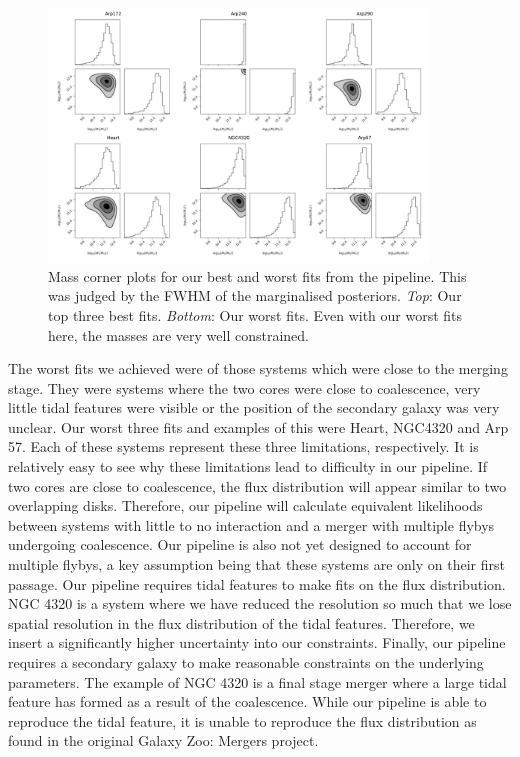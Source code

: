 \begin{figure}
    \centering
    \includegraphics[width=0.9\textwidth]{Chapter1/figures/masses-comb.pdf}
    \caption{Mass corner plots for our best and worst fits from the pipeline. This was judged by the FWHM of the marginalised posteriors. \textit{Top}: Our top three best fits. \textit{Bottom}: Our worst fits. Even with our worst fits here, the masses are very well constrained.}
    \label{fig:mass_constraint}
\end{figure}

The worst fits we achieved were of those systems which were close to the merging stage. They were systems where the two cores were close to coalescence, very little tidal features were visible or the position of the secondary galaxy was very unclear. Our worst three fits and examples of this were Heart, NGC4320 and Arp 57. Each of these systems represent these three limitations, respectively. It is relatively easy to see why these limitations lead to difficulty in our pipeline. If two cores are close to coalescence, the flux distribution will appear similar to two overlapping disks. Therefore, our pipeline will calculate equivalent likelihoods between systems with little to no interaction and a merger with multiple flybys undergoing coalescence. Our pipeline is also not yet designed to account for multiple flybys, a key assumption being that these systems are only on their first passage. Our pipeline requires tidal features to make fits on the flux distribution. NGC 4320 is a system where we have reduced the resolution so much that we lose spatial resolution in the flux distribution of the tidal features. Therefore, we insert a significantly higher uncertainty into our constraints. Finally, our pipeline requires a secondary galaxy to make reasonable constraints on the underlying parameters. The example of NGC 4320 is a final stage merger where a large tidal feature has formed as a result of the coalescence. While our pipeline is able to reproduce the tidal feature, it is unable to reproduce the flux distribution as found in the original Galaxy Zoo: Mergers project.

